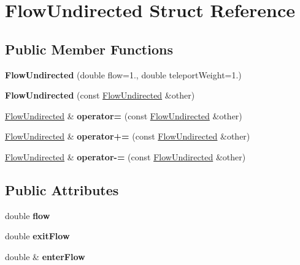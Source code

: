 \hypertarget{structFlowUndirected}{}\section{Flow\+Undirected Struct Reference}
\label{structFlowUndirected}
\subsection*{Public Member Functions}
\begin{DoxyCompactItemize}
\item 
\mbox{\label{structFlowUndirected_a9e9054bd70dde86c25affc1c310c73cc}} 
{\bfseries Flow\+Undirected} (double flow=1., double teleport\+Weight=1.)
\item 
\mbox{\label{structFlowUndirected_af157a868d727052f9342d27030229bd2}} 
{\bfseries Flow\+Undirected} (const \mbox{\hyperlink{structFlowUndirected}{Flow\+Undirected}} \&other)
\item 
\mbox{\label{structFlowUndirected_a21bff1d4d8156cf33f93e2df3964d0ab}} 
\mbox{\hyperlink{structFlowUndirected}{Flow\+Undirected}} \& {\bfseries operator=} (const \mbox{\hyperlink{structFlowUndirected}{Flow\+Undirected}} \&other)
\item 
\mbox{\label{structFlowUndirected_a351e0f0c1e1e7f09edf20886d5b11f1d}} 
\mbox{\hyperlink{structFlowUndirected}{Flow\+Undirected}} \& {\bfseries operator+=} (const \mbox{\hyperlink{structFlowUndirected}{Flow\+Undirected}} \&other)
\item 
\mbox{\label{structFlowUndirected_a20d713d9b8c414308b3b8f54e952eb00}} 
\mbox{\hyperlink{structFlowUndirected}{Flow\+Undirected}} \& {\bfseries operator-\/=} (const \mbox{\hyperlink{structFlowUndirected}{Flow\+Undirected}} \&other)
\end{DoxyCompactItemize}
\subsection*{Public Attributes}
\begin{DoxyCompactItemize}
\item 
\mbox{\label{structFlowUndirected_a4cf8695882830172ae96ff34abaa14bd}} 
double {\bfseries flow}
\item 
\mbox{\label{structFlowUndirected_a2f7521e1f3ca8864573e00a844e6e1dc}} 
double {\bfseries exit\+Flow}
\item 
\mbox{\label{structFlowUndirected_ad4052d04a6c85abb10b05bc05824f95d}} 
double \& {\bfseries enter\+Flow}
\end{DoxyCompactItemize}
